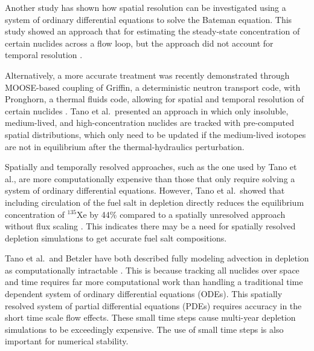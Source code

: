 Another study has shown how spatial resolution can be investigated using a system of ordinary differential equations to solve the Bateman equation.
This study showed an approach that for estimating the steady-state concentration of certain nuclides across a flow loop, but the approach did not account for temporal resolution \cite{shahbazi_steady-state_2022}.

Alternatively, a more accurate treatment was recently demonstrated through MOOSE-based coupling of Griffin, a deterministic neutron transport code, with Pronghorn, a thermal fluids code, allowing for spatial and temporal resolution of certain nuclides \cite{tano2023coupled}.
Tano et al.\ presented an approach in which only insoluble, medium-lived, and high-concentration nuclides are tracked with pre-computed spatial distributions, which only need to be updated if the medium-lived isotopes are not in equilibrium after the thermal-hydraulics perturbation.

Spatially and temporally resolved approaches, such as the one used by Tano et al., are more computationally expensive than those that only require solving a system of ordinary differential equations.
However, Tano et al.\ showed that including circulation of the fuel salt in depletion directly reduces the equilibrium concentration of $^{135}$Xe by 44\% compared to a spatially unresolved approach without flux scaling \cite{tano2023coupled}.
This indicates there may be a need for spatially resolved depletion simulations to get accurate fuel salt compositions.


Tano et al.\ and Betzler have both described fully modeling advection in depletion as computationally intractable \cite{tano2023coupled, betzler_liquid-fueled_2021}.
This is because tracking all nuclides over space and time requires far more computational work than handling a traditional time dependent system of ordinary differential equations (ODEs).
This spatially resolved system of partial differential equations (PDEs) requires accuracy in the short time scale flow effects.
These small time steps cause multi-year depletion simulations to be exceedingly expensive.
The use of small time steps is also important for numerical stability.

